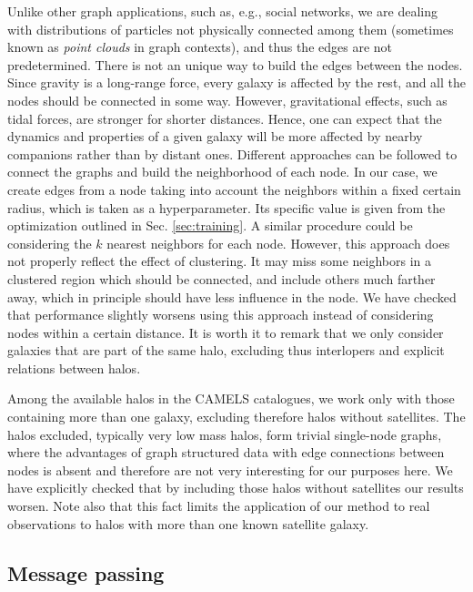 \documentclass[twocolumn]{aastex631}
\begin{document}
Unlike other graph applications, such as, e.g., social networks, we are dealing with distributions of particles not physically connected among them (sometimes known as \textit{point clouds} in graph contexts), and thus the edges are not predetermined. There is not an unique way to build the edges between the nodes. Since gravity is a long-range force, every galaxy is affected by the rest, and all the nodes should be connected in some way. However, gravitational effects, such as tidal forces, are stronger for shorter distances. Hence, one can expect that the dynamics and properties of a given galaxy will be more affected by nearby companions rather than by distant ones. Different approaches can be followed to connect the graphs and build the neighborhood of each node. In our case, we create edges from a node taking into account the neighbors within a fixed certain radius, which is taken as a hyperparameter. Its specific value is given from the optimization outlined in Sec. \ref{sec:training}. A similar procedure could be considering the $k$ nearest neighbors for each node. However, this approach does not properly reflect the effect of clustering. It may miss some neighbors in a clustered region which should be connected, and include others much farther away, which in principle should have less influence in the node. We have checked that performance slightly worsens using this approach instead of considering nodes within a certain distance. It is worth it to remark that we only consider galaxies that are part of the same halo, excluding thus interlopers and explicit relations between halos.


Among the available halos in the CAMELS catalogues, we work only with those containing more than one galaxy, excluding therefore halos without satellites. The halos excluded,  typically very low mass halos, form trivial single-node graphs, where the advantages of graph structured data with edge connections between nodes is absent and therefore are not very interesting for our purposes here. We have explicitly checked that by including those halos without satellites our results worsen. Note also that this fact limits the application of our method to real observations to halos with more than one known satellite galaxy.



\subsection{Message passing}
\end{document}
